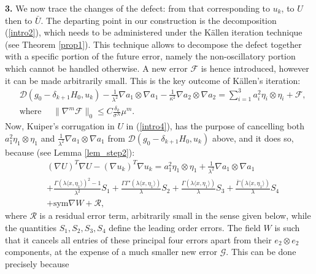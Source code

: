 \documentclass[reqno,twoside,11pt]{amsart}
\newcommand{\sym}{\mathrm{sym}}
\numberwithin{equation}{section}
\theoremstyle{plain}
\theoremstyle{definition}
\begin{document}
{\bf 3.} We now trace the changes of the defect: from that corresponding to $u_k$,
to $U$ then to $\bar U$. The departing point in our
construction is the decomposition 
(\ref{intro2}), which needs to be administered under the K\"allen iteration technique (see
Theorem \ref{prop1}). This technique allows to decompose the defect
together with a specific portion of the future error, namely the non-oscillatory
portion which cannot be handled otherwise. A new error 
$\mathcal{F}$ is hence introduced, however it can be made arbitrarily
small. This is the key outcome of K\"allen's iteration:
\begin{equation}\label{gaza}
\begin{split}
& \mathcal{D}(g_0-\delta_{k+1}H_0, u_k) - \frac{1}{\lambda^2}\nabla a_{1}\otimes \nabla a_{1}
- \frac{1}{\kappa^2}\nabla a_{2} \otimes \nabla a_2 = \sum_{i=1}^3a_{i}^2\eta_i\otimes\eta_i 
+\mathcal{F}, \\
& \mbox{where } \quad \|\nabla^{m}\mathcal{F}\|_0\leq C\frac{\delta_k}{\sigma^{N}} \mu^m.
\end{split}
\end{equation}
Now, Kuiper's corrugation in $U$ in (\ref{intro4}), has the purpose
of cancelling both $a_1^2\eta_1\otimes \eta_1$ and $\frac{1}{\lambda^2}\nabla a_{1}\otimes \nabla a_{1}$
from $\mathcal{D}(g_0-\delta_{k+1}H_0, u_k)$ above, and it does so,
because (see Lemma \ref{lem_step2}):
\begin{equation}\label{intro5}
\begin{split}
& (\nabla U)^T\nabla U - (\nabla u_k)^T\nabla u_k = a_1^2\eta_1\otimes
\eta_1 + \frac{1}{\lambda^2}\nabla a_{1}\otimes \nabla a_{1}
\\ & +\frac{\Gamma(\lambda \langle x, \eta_1\rangle)^2-1}{\lambda^2} S_1 + 
  \frac{\Gamma\Gamma'(\lambda \langle x, \eta_1\rangle)}{\lambda}S_2 +
\frac{\Gamma(\lambda \langle x, \eta_1\rangle)}{\lambda}S_3 + \frac{\bar\Gamma(\lambda
  \langle x, \eta_1\rangle)}{\lambda}S_4 \\ & +\sym\nabla W + \mathcal{R},
\end{split}
\end{equation}
where $\mathcal{R}$ is a residual error term, arbitrarily
small in the sense given below, while the quantities $S_1, S_2, S_3, S_4$
define the leading order errors. The field $W$ is such
that it cancels all entries of these
principal four errors %
apart from their $e_2\otimes e_2$ components, at the expense of a much
smaller new error $\mathcal {G}$. This can be done precisely because 
\end{document}
